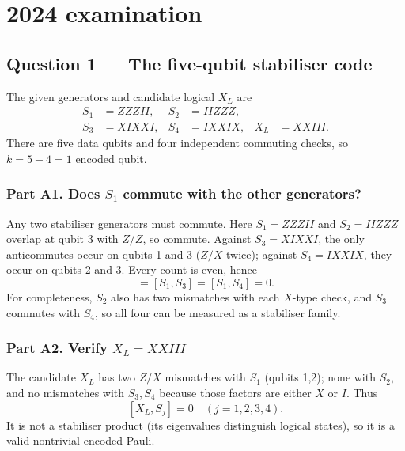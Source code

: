 \clearpage
\section{2024 examination}
\subsection{Question 1 --- The five-qubit stabiliser code}
The given generators and candidate logical $X_L$ are
\begin{align*}
S_1&=ZZZII, &S_2&=IIZZZ,\\
S_3&=XIXXI, &S_4&=IXXIX, & X_L&=XXIII.
\end{align*}
There are five data qubits and four independent commuting checks, so $k=5-4=1$ encoded qubit.

\subsubsection*{Part A1. Does $S_1$ commute with the other generators?}
Any two stabiliser generators must commute. Here $S_1=ZZZII$ and $S_2=IIZZZ$ overlap at qubit 3 with $Z/Z$, so commute. Against $S_3=XIXXI$, the only anticommutes occur on qubits 1 and 3 ($Z/X$ twice); against $S_4=IXXIX$, they occur on qubits 2 and 3. Every count is even, hence
\begin{equation}[S_1,S_2]=[S_1,S_3]=[S_1,S_4]=0.\end{equation}
For completeness, $S_2$ also has two mismatches with each $X$-type check, and $S_3$ commutes with $S_4$, so all four can be measured as a stabiliser family.

\subsubsection*{Part A2. Verify $X_L=XXIII$}
The candidate $X_L$ has two $Z/X$ mismatches with $S_1$ (qubits 1,2); none with $S_2$, and no mismatches with $S_3,S_4$ because those factors are either $X$ or $I$. Thus
\begin{equation}\boxed{[X_L,S_j]=0\quad(j=1,2,3,4).}\end{equation}
It is not a stabiliser product (its eigenvalues distinguish logical states), so it is a valid nontrivial encoded Pauli.

